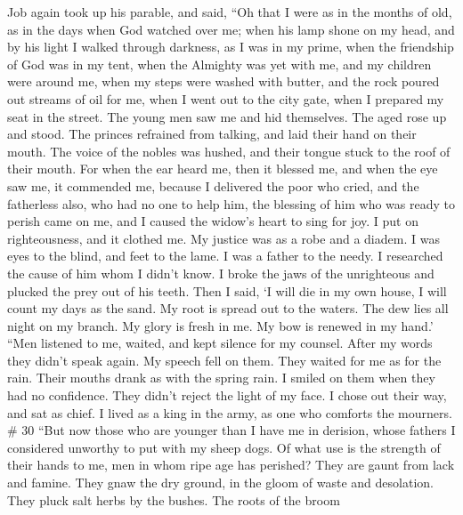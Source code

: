  Job again took up his parable, and said,  ``Oh
that I were as in the months of old, as in the days when God watched
over me;  when his lamp shone on my head, and by his light I
walked through darkness,  as I was in my prime, when the
friendship of God was in my tent,  when the Almighty was yet
with me, and my children were around me,  when my steps were
washed with butter, and the rock poured out streams of oil for me,
 when I went out to the city gate, when I prepared my seat
in the street.  The young men saw me and hid themselves. The
aged rose up and stood.  The princes refrained from talking,
and laid their hand on their mouth.  The voice of the
nobles was hushed, and their tongue stuck to the roof of their mouth.
 For when the ear heard me, then it blessed me, and when
the eye saw me, it commended me,  because I delivered the
poor who cried, and the fatherless also, who had no one to help him,
 the blessing of him who was ready to perish came on me,
and I caused the widow's heart to sing for joy.  I put on
righteousness, and it clothed me. My justice was as a robe and a diadem.
 I was eyes to the blind, and feet to the lame.
 I was a father to the needy. I researched the cause of him
whom I didn't know.  I broke the jaws of the unrighteous
and plucked the prey out of his teeth.  Then I said, `I
will die in my own house, I will count my days as the sand.
 My root is spread out to the waters. The dew lies all
night on my branch.  My glory is fresh in me. My bow is
renewed in my hand.'  ``Men listened to me, waited, and
kept silence for my counsel.  After my words they didn't
speak again. My speech fell on them.  They waited for me as
for the rain. Their mouths drank as with the spring rain. 
I smiled on them when they had no confidence. They didn't reject the
light of my face.  I chose out their way, and sat as chief.
I lived as a king in the army, as one who comforts the mourners. \# 30
 ``But now those who are younger than I have me in derision,
whose fathers I considered unworthy to put with my sheep dogs.
 Of what use is the strength of their hands to me, men in
whom ripe age has perished?  They are gaunt from lack and
famine. They gnaw the dry ground, in the gloom of waste and desolation.
 They pluck salt herbs by the bushes. The roots of the broom
